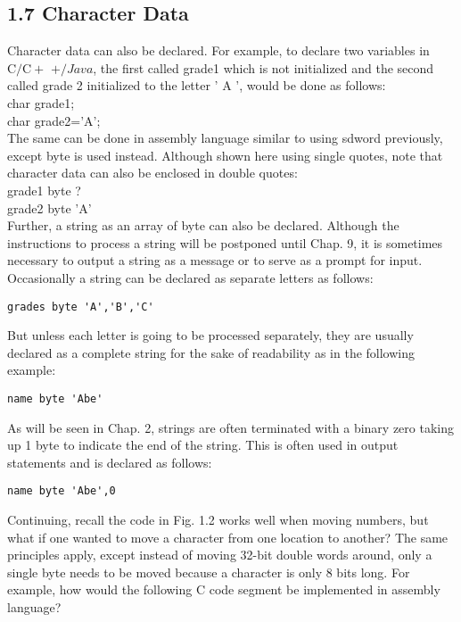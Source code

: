 \documentclass[10pt]{article}
\begin{document}
\subsection*{1.7 Character Data}
Character data can also be declared. For example, to declare two variables in $\mathrm{C} / \mathrm{C}+$ $+/ J a v a$, the first called grade1 which is not initialized and the second called grade 2 initialized to the letter ' A ', would be done as follows:\\
char grade1;\\
char grade2='A';\\
The same can be done in assembly language similar to using sdword previously, except byte is used instead. Although shown here using single quotes, note that character data can also be enclosed in double quotes:\\
grade1 byte ?\\
grade2 byte 'A'\\
Further, a string as an array of byte can also be declared. Although the instructions to process a string will be postponed until Chap. 9, it is sometimes necessary to output a string as a message or to serve as a prompt for input. Occasionally a string can be declared as separate letters as follows:

\begin{verbatim}
grades byte 'A','B','C'
\end{verbatim}

But unless each letter is going to be processed separately, they are usually declared as a complete string for the sake of readability as in the following example:

\begin{verbatim}
name byte 'Abe'
\end{verbatim}

As will be seen in Chap. 2, strings are often terminated with a binary zero taking up 1 byte to indicate the end of the string. This is often used in output statements and is declared as follows:

\begin{verbatim}
name byte 'Abe',0
\end{verbatim}

Continuing, recall the code in Fig. 1.2 works well when moving numbers, but what if one wanted to move a character from one location to another? The same principles apply, except instead of moving 32-bit double words around, only a single byte needs to be moved because a character is only 8 bits long. For example, how would the following C code segment be implemented in assembly language?
\end{document}

